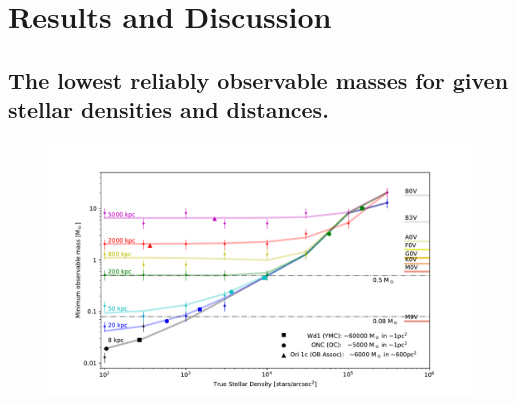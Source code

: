 \section{Results and Discussion}
\label{sec:results}

\subsection{The lowest reliably observable masses for given stellar densities
and distances.}

\begin{figure}

    \centering
    \includegraphics[width=\textwidth]{images/old_trusted_mass}


\end{figure}
